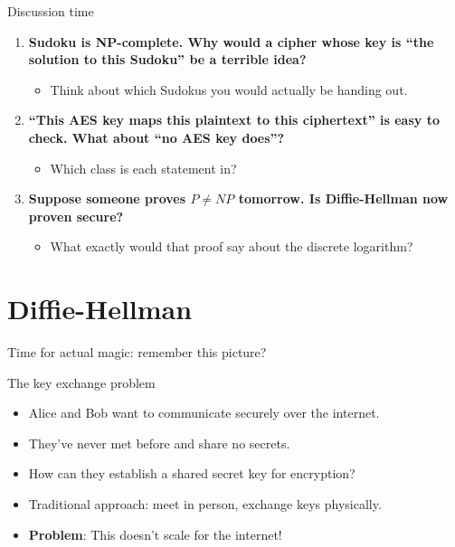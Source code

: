 \ifdefined\PRESENTATION\else\PassOptionsToClass{handout}{beamer}\fi\documentclass[aspectratio=169, lualatex]{beamer}
\begin{document}
\begin{frame}{Discussion time}
	\begin{enumerate}
		\item \textbf{Sudoku is NP-complete. Why would a cipher whose key is ``the solution to this Sudoku'' be a terrible idea?}
		      \begin{itemize}
			      \item Think about which Sudokus you would actually be handing out.
		      \end{itemize}
		\item \textbf{``This AES key maps this plaintext to this ciphertext'' is easy to check. What about ``no AES key does''?}
		      \begin{itemize}
			      \item Which class is each statement in?
		      \end{itemize}
		\item \textbf{Suppose someone proves $P \neq NP$ tomorrow. Is Diffie-Hellman now proven secure?}
		      \begin{itemize}
			      \item What exactly would that proof say about the discrete logarithm?
		      \end{itemize}
	\end{enumerate}
\end{frame}

\section{Diffie-Hellman}

\begin{frame}{Time for actual magic: remember this picture?}
\end{frame}

\begin{frame}{The key exchange problem}
	\begin{itemize}[<+->]
		\item Alice and Bob want to communicate securely over the internet.
		\item They've never met before and share no secrets.
		\item How can they establish a shared secret key for encryption?
		\item Traditional approach: meet in person, exchange keys physically.
		\item \textbf{Problem}: This doesn't scale for the internet!
	\end{itemize}
\end{frame}
\end{document}
